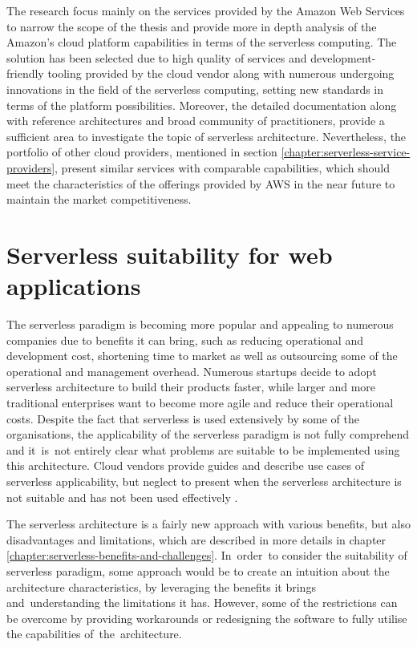 The research focus mainly on the services provided by the Amazon Web Services to narrow the scope of the thesis and provide more in depth analysis of the Amazon's cloud platform capabilities in terms of the serverless computing.
The solution has been selected due to high quality of services and development-friendly tooling provided by the cloud vendor along with numerous undergoing innovations in the field of the serverless computing, setting new standards in terms of the platform possibilities.
Moreover, the detailed documentation along with reference architectures and broad community of practitioners, provide a sufficient area to investigate the topic of serverless architecture.
Nevertheless, the portfolio of other cloud providers, mentioned in section \ref{chapter:serverless-service-providers}, present similar services with comparable capabilities, which should meet the characteristics of the offerings provided by AWS in the near future to maintain the market competitiveness.

\section{Serverless suitability for web applications} \label{chapter:serverless-suitability}

The serverless paradigm is becoming more popular and appealing to numerous companies due to benefits it can bring, such as reducing operational and development cost, shortening time to market as well as outsourcing some of the operational and management overhead.
Numerous startups decide to adopt serverless architecture to build their products faster, while larger and more traditional enterprises want to become more agile and reduce their operational costs.
Despite the fact that serverless is used extensively by some of the organisations, the applicability of the serverless paradigm is not fully comprehend and it~is~not entirely clear what problems are suitable to be implemented using this architecture.
Cloud vendors provide guides and describe use cases of serverless applicability, but neglect to present when the serverless architecture is not suitable and has not been used effectively \cite{EvaluationOfServerlessApplicationProgrammingModel}.

The serverless architecture is a fairly new approach with various benefits, but also disadvantages and limitations, which are described in more details in chapter \ref{chapter:serverless-benefits-and-challenges}.
In~order~to consider the suitability of serverless paradigm, some approach would be to create an intuition about the architecture characteristics, by leveraging the benefits it brings and~understanding the limitations it has.
However, some of the restrictions can be overcome by providing workarounds or redesigning the software to fully utilise the capabilities of~the~architecture.

